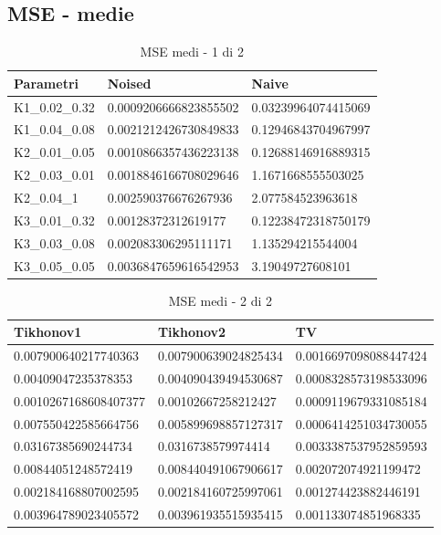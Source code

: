 \documentclass[12pt]{article}
\begin{document}
    \subsection{MSE - medie}
    
    \begin{table}[!ht]
    \centering
    \begin{tabular}{|l|l|l|}
    \hline
        Parametri & Noised & Naive \\ \hline
        K1\_0.02\_0.32 & 0.0009206666823855502 & 0.03239964074415069 \\ \hline
        K1\_0.04\_0.08 & 0.0021212426730849833 & 0.12946843704967997 \\ \hline
        K2\_0.01\_0.05 & 0.0010866357436223138 & 0.12688146916889315 \\ \hline
        K2\_0.03\_0.01 & 0.0018846166708029646 & 1.1671668555503025 \\ \hline
        K2\_0.04\_1 & 0.002590376676267936 & 2.077584523963618 \\ \hline
        K3\_0.01\_0.32 & 0.00128372312619177 & 0.12238472318750179 \\ \hline
        K3\_0.03\_0.08 & 0.002083306295111171 & 1.135294215544004 \\ \hline
        K3\_0.05\_0.05 & 0.0036847659616542953 & 3.19049727608101 \\ \hline
    \end{tabular}
    \caption{MSE medi - 1 di 2}
    \label{table:10}
    \end{table}
    
    \begin{table}[!ht]
    \centering
    \begin{tabular}{|l|l|l|}
    \hline
        Tikhonov1 & Tikhonov2 & TV \\ \hline
        0.007900640217740363 & 0.007900639024825434 & 0.0016697098088447424 \\ \hline
        0.00409047235378353 & 0.004090439494530687 & 0.0008328573198533096 \\ \hline
        0.0010267168608407377 & 0.00102667258212427 & 0.0009119679331085184 \\ \hline
        0.007550422585664756 & 0.005899698857127317 & 0.0006414251034730055 \\ \hline
        0.03167385690244734 & 0.0316738579974414 & 0.0033387537952859593 \\ \hline
        0.00844051248572419 & 0.008440491067906617 & 0.002072074921199472 \\ \hline
        0.002184168807002595 & 0.002184160725997061 & 0.001274423882446191 \\ \hline
        0.003964789023405572 & 0.003961935515935415 & 0.001133074851968335 \\ \hline
    \end{tabular}
    \caption{MSE medi - 2 di 2}
    \label{table:11}
    \end{table}
    
\end{document}
